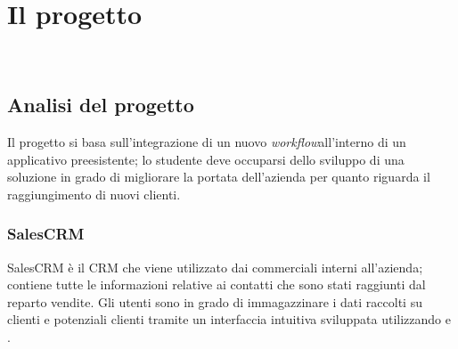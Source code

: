 \chapter{Il progetto}
\label{cap:descrizione-stage}

\\

\section{Analisi del progetto}

Il progetto si basa sull'integrazione di un nuovo \emph{\gls{workflow}}\glsfirstoccur all'interno di un applicativo preesistente; lo studente deve occuparsi dello sviluppo di una soluzione in grado di migliorare la portata dell'azienda per quanto riguarda il raggiungimento di nuovi clienti.

\subsection{SalesCRM}
SalesCRM è il \gls{CRM} che viene utilizzato dai commerciali interni all'azienda; contiene tutte le informazioni relative ai contatti che sono stati raggiunti dal reparto vendite. 
Gli utenti sono in grado di immagazzinare i dati raccolti su clienti e potenziali clienti tramite un interfaccia intuitiva sviluppata utilizzando  e .

